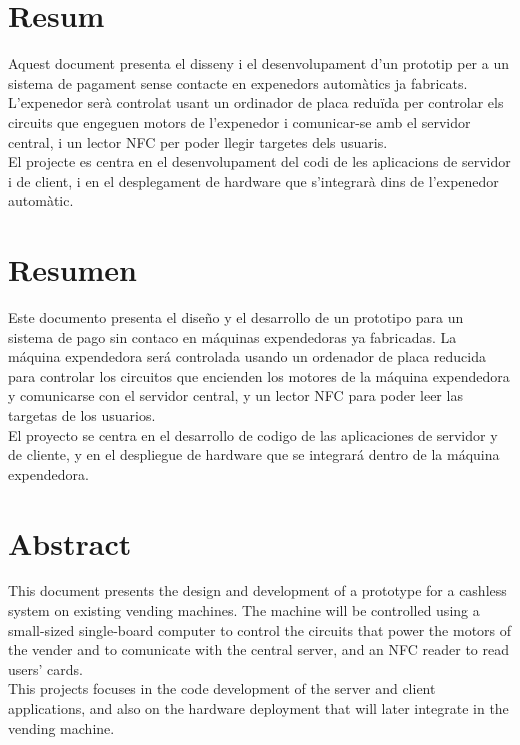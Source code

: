 \section*{Resum}

Aquest document presenta el disseny i el desenvolupament d'un prototip per a un sistema de pagament sense contacte en expenedors automàtics ja fabricats.
L'expenedor serà controlat usant un ordinador de placa reduïda per controlar els circuits que engeguen motors de l'expenedor i comunicar-se amb el servidor central, i un lector NFC per poder llegir targetes dels usuaris. 
\\

El projecte es centra en el desenvolupament del codi de les aplicacions de servidor i de client, i en el desplegament de hardware que s'integrarà dins de l'expenedor automàtic.

\section*{Resumen}

Este documento presenta el diseño y el desarrollo de un prototipo para un sistema de pago sin contaco en máquinas expendedoras ya fabricadas.
La máquina expendedora será controlada usando un ordenador de placa reducida para controlar los circuitos que encienden los motores de la máquina expendedora y comunicarse con el servidor central, y un lector NFC para poder leer las targetas de los usuarios.
\\

El proyecto se centra en el desarrollo de codigo de las aplicaciones de servidor y de cliente, y en el despliegue de hardware que se integrará dentro de la máquina expendedora.

\section*{Abstract}

This document presents the design and development of a prototype for a cashless system on existing vending machines.
The machine will be controlled using a small-sized single-board computer to control the circuits that power the motors of the vender and to comunicate with the central server, and an NFC reader to read users' cards.
\\

This projects focuses in the code development of the server and client applications, and also on the hardware deployment that will later integrate in the vending machine.
